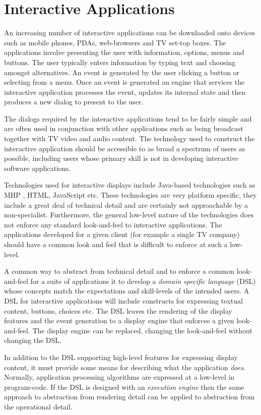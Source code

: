
\chapter{Interactive Applications}

An increasing number of interactive applications can be downloaded
onto devices such as mobile phones, PDAs, web-browsers and TV set-top
boxes. The applications involve presenting the user with information,
options, menus and buttons. The user typically enters information
by typing text and choosing amongst alternatives. An event is generated
by the user clicking a button or selecting from a menu. Once an event
is generated an engine that services the interactive application processes
the event, updates its internal state and then produces a new dialog
to present to the user.

The dialogs required by the interactive applications tend to be fairly
simple and are often used in conjunction with other applications such
as being broadcast together with TV video and audio content. The technology
used to construct the interactive application should be accessible
to as broad a spectrum of users as possible, including users whose
primary skill is not in developing interactive software applications.

Technologies used for interactive displays include Java-based technologies
such as MHP , HTML, JavaScript etc. These technologies are very platform
specific, they include a great deal of technical detail and are certainly
not approachable by a non-specialist. Furthermore, the general low-level
nature of the technologies does not enforce any standard look-and-feel
to interactive applications. The applications developed for a given
client (for example a single TV company) should have a common look
and feel that is difficult to enforce at such a low-level.

A common way to abstract from technical detail and to enforce a common
look-and-feel for a suite of applications it to develop a \emph{domain
specific language} (DSL) whose concepts match the expectations and
skill-levels of the intended users. A DSL for interactive applications
will include constructs for expressing textual content, buttons, choices
etc. The DSL leaves the rendering of the display features and the
event generation to a display engine that enforces a given look-and-feel.
The display engine can be replaced, changing the look-and-feel without
changing the DSL.

In addition to the DSL supporting high-level features for expressing
display content, it must provide some means for describing what the
application \emph{does}. Normally, application processing algorithms
are expressed at a low-level in program-code. If the DSL is designed
with an \emph{execution engine} then the same approach to abstraction
from rendering detail can be applied to abstraction from the operational
detail.

